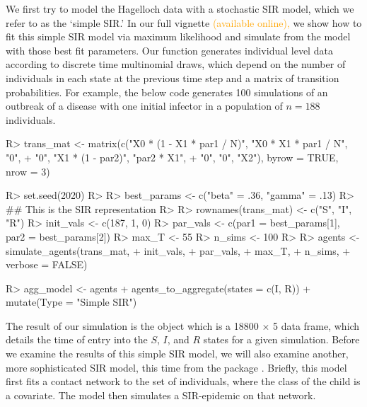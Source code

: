 \documentclass[
  shortnames]{jss}
\begin{document}
We first try to model the Hagelloch data with a stochastic SIR model,
which we refer to as the `simple SIR.' In our full vignette
\textcolor{orange}{(available online),} we show how to fit this simple
SIR model via maximum likelihood and simulate from the model with those
best fit parameters. Our function  generates
individual level data according to discrete time multinomial draws,
which depend on the number of individuals in each state at the previous
time step and a matrix of transition probabilities. For example, the
below code generates 100 simulations of an outbreak of a disease with
one initial infector in a population of \(n= 188\) individuals.

\begin{CodeChunk}
\begin{CodeInput}
R> trans_mat <- matrix(c("X0 * (1 - X1 * par1 / N)", "X0 * X1  * par1 / N", "0",
+                   "0", "X1 * (1 - par2)", "par2 * X1",
+                   "0", "0", "X2"), byrow = TRUE, nrow = 3)
\end{CodeInput}
\end{CodeChunk}

\begin{CodeChunk}
\begin{CodeInput}
R> set.seed(2020)
R> 
R> best_params <- c("beta" = .36, "gamma" = .13)
R> ## This is the SIR representation
R> 
R> rownames(trans_mat) <- c("S", "I", "R")
R> init_vals <- c(187, 1, 0)
R> par_vals <- c(par1 = best_params[1], par2 = best_params[2])
R> max_T <- 55
R> n_sims <- 100
R> 
R> agents <- simulate_agents(trans_mat,
+                        init_vals,
+                        par_vals,
+                        max_T,
+                        n_sims,
+                        verbose = FALSE)
\end{CodeInput}
\end{CodeChunk}

\begin{CodeChunk}
\begin{CodeInput}
R> agg_model <- agents %
+   agents_to_aggregate(states = c(I, R)) %
+   mutate(Type = "Simple SIR")
\end{CodeInput}
\end{CodeChunk}

The result of our simulation is the object  which is a
18800 \(\times\) 5 data frame, which details the time of entry into the
\(S\), \(I\), and \(R\) states for a given simulation. Before we examine
the results of this simple SIR model, we will also examine another, more
sophisticated SIR model, this time from the package 
\citep{Jenness2018}. Briefly, this model first fits a contact network to
the set of individuals, where the class of the child is a covariate. The
model then simulates a SIR-epidemic on that network.
\end{document}
